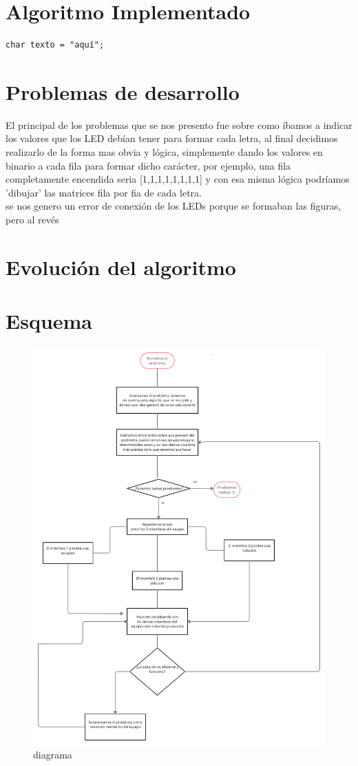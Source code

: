\documentclass{article}
\begin{document}
\section{Algoritmo Implementado} \label{contenido}
\begin{lstlisting}
char texto = "aquí";
\end{lstlisting}
\section{Problemas de desarrollo} \label{conclulsion}
El principal de los problemas que se nos presento fue sobre como íbamos a indicar los valores que los LED debían tener para formar cada letra, al final decidimos realizarlo de la forma mas obvia y lógica, simplemente dando los valores en binario a cada fila para formar dicho carácter, por ejemplo, una fila completamente encendida seria [1,1,1,1,1,1,1,1] y con esa misma lógica podríamos  'dibujar' las matrices fila por fia de cada letra. \\
se nos genero un error de conexión de los LEDs porque se formaban las figuras, pero al revés
\section{Evolución del algoritmo} \label{conclulsion}
\section{Esquema} \label{contenido}
\begin{figure}
    \centering
    \includegraphics[width=14cm]{diagrama.png}
    \caption{diagrama}
    \label{fig:my_label}
\end{figure}


\end{document}
